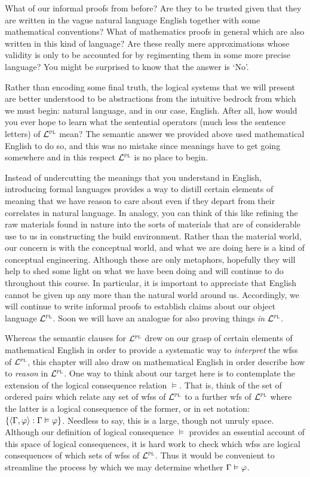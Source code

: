 What of our informal proofs from before?
Are they to be trusted given that they are written in the vague natural language English together with some mathematical conventions? 
What of mathematics proofs in general which are also written in this kind of language?
Are these really mere approximations whose validity is only to be accounted for by regimenting them in some more precise language?
You might be surprised to know that the answer is `No'.

Rather than encoding some final truth, the logical systems that we will present are better understood to be abstractions from the intuitive bedrock from which we must begin: natural language, and in our case, English.
After all, how would you ever hope to learn what the sentential operators (much less the sentence letters) of $\mathcal{L}^{\textsc{pl}}$ mean? 
The semantic answer we provided above used mathematical English to do so, and this was no mistake since meanings have to get going somewhere and in this respect $\mathcal{L}^{\textsc{pl}}$ is no place to begin.

Instead of undercutting the meanings that you understand in English, introducing formal languages provides a way to distill certain elements of meaning that we have reason to care about even if they depart from their correlates in natural language. 
In analogy, you can think of this like refining the raw materials found in nature into the sorts of materials that are of considerable use to us in constructing the build environment.
Rather than the material world, our concern is with the conceptual world, and what we are doing here is a kind of conceptual engineering.
Although these are only metaphors, hopefully they will help to shed some light on what we have been doing and will continue to do throughout this course.
In particular, it is important to appreciate that English cannot be given up any more than the natural world around us.
Accordingly, we will continue to write informal proofs to establish claims about our object language $\mathcal{L}^{\textsc{pl}}$.
Soon we will have an analogue for also proving things \textit{in} $\mathcal{L}^{\textsc{pl}}$.

Whereas the semantic clauses for $\mathcal{L}^{\textsc{pl}}$ drew on our grasp of certain elements of mathematical English in order to provide a systematic way to \textit{interpret} the wfss of $\mathcal{L}^{\textsc{pl}}$, this chapter will also draw on mathematical English in order describe how to \textit{reason} in $\mathcal{L}^{\textsc{pl}}$.
One way to think about our target here is to contemplate the extension of the logical consequence relation $\vDash$.
That is, think of the set of ordered pairs which relate any set of wfss of $\mathcal{L}^{\textsc{pl}}$ to a further wfs of $\mathcal{L}^{\textsc{pl}}$ where the latter is a logical consequence of the former, or in set notation: $\lbrace\langle\Gamma, \varphi\rangle : \Gamma \vDash \varphi\rbrace$.
Needless to say, this is a large, though not unruly space.
Although our definition of logical consequence $\vDash$ provides an essential account of this space of logical consequences, it is hard work to check which wfss are logical consequences of which sets of wfss of $\mathcal{L}^{\textsc{pl}}$. 
Thus it would be convenient to streamline the process by which we may determine whether $\Gamma \vDash \varphi$.

